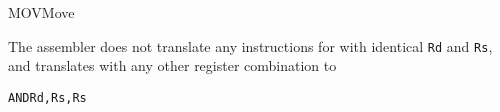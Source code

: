 \begin{instruction}{MOV}{Move}
\begin{remarks}
The assembler does not translate any instructions for \texttt{\mnemonic} with identical \texttt{Rd} and \texttt{Rs}, and translates \texttt{\mnemonic} with any other register combination to
\begin{alltt}
    AND  Rd, Rs, Rs
\end{alltt}
\end{remarks}
\end{instruction}
